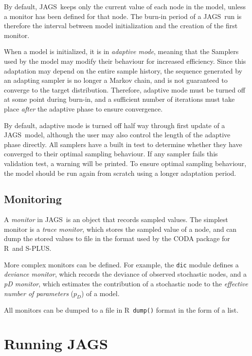 \documentclass[11pt, a4paper, titlepage]{report}
\newcommand{\JAGS}{\textsf{JAGS}}
\newcommand{\R}{\textsf{R}}
\begin{document}
By default, \JAGS\ keeps only the current value of each node in the
model, unless a monitor has been defined for that node. The burn-in
period of a \JAGS\ run is therefore the interval between model
initialization and the creation of the first monitor.

When a model is initialized, it is in {\em adaptive mode}, meaning
that the Samplers used by the model may modify their behaviour for
increased efficiency. Since this adaptation may depend on the entire
sample history, the sequence generated by an adapting sampler is no
longer a Markov chain, and is not guaranteed to converge to the target
distribution. Therefore, adaptive mode must be turned off at some
point during burn-in, and a sufficient number of iterations must take
place {\em after} the adaptive phase to ensure convergence.

By default, adaptive mode is turned off half way through first update
of a \JAGS\ model, although the user may also control the length of
the adaptive phase directly.  All samplers have a built in test to
determine whether they have converged to their optimal sampling
behaviour.  If any sampler fails this validation test, a warning will
be printed. To ensure optimal sampling behaviour, the model should be
run again from scratch using a longer adaptation period.

\section{Monitoring}
\label{section:monitoring}

A {\em monitor} in \JAGS\ is an object that records sampled
values. The simplest monitor is a {\em trace monitor}, which stores
the sampled value of a node, and can dump the stored values to file
in the format used by the CODA package for \R\ and S-PLUS.

More complex monitors can be defined.  For example, the \verb+dic+
module defines a {\em deviance monitor}, which records the deviance of
observed stochastic nodes, and a {\em pD monitor}, which estimates the
contribution of a stochastic node to the {\em effective number of
parameters} ($p_D$) of a model.

All monitors can be dumped to a file in \R\ \verb+dump()+ format in
the form of a list.

\chapter{Running \JAGS}
\end{document}
